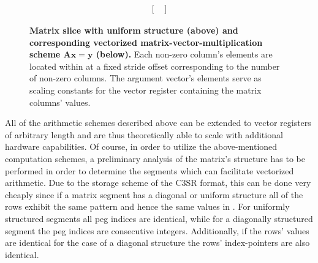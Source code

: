 \begin{figure}[ht]
$$\begin{matrix}
\begin{bmatrix}
                                                                                     \end{bmatrix}
        \end{matrix}
        $$
        \caption[Matrix slice with uniform structure and corresponding vectorized matrix-vector-multiplication scheme.]{\textbf{Matrix slice with uniform structure (above) and corresponding vectorized matrix-vector-multiplication scheme $\bm{Ax=y}$ (below).} Each non-zero column's elements are located within \V at a fixed stride offset corresponding to the number of non-zero columns. The argument vector's elements serve as scaling constants for the vector register containing the matrix columns' values.}
        \label{fig:simd_scheme_uniform}
      \end{figure}

      All of the arithmetic schemes described above can be extended to vector registers of arbitrary length and are thus theoretically able to scale with additional hardware capabilities. Of course, in order to utilize the above-mentioned computation schemes, a preliminary analysis of the matrix's structure has to be performed in order to determine the segments which can facilitate vectorized arithmetic. Due to the storage scheme of the C3SR format, this can be done very cheaply since if a matrix segment has a diagonal or uniform structure all of the rows exhibit the same pattern and hence the same values in \JS. For uniformly structured segments all peg indices are identical, while for a diagonally structured segment the peg indices are consecutive integers. Additionally, if the rows' values are identical for the case of a diagonal structure the rows' index-pointers \VS are also identical.


